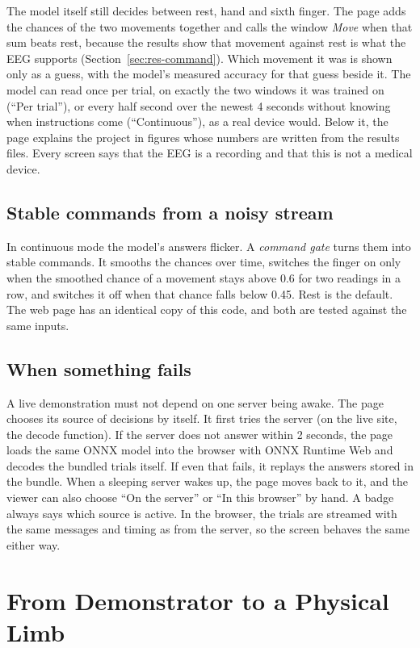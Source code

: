 The model itself still decides between rest, hand and sixth finger. The page adds the
chances of the two movements together and calls the window \emph{Move} when that sum
beats rest, because the results show that movement against rest is what the EEG supports
(Section~\ref{sec:res-command}). Which movement it was is shown only as a guess, with the
model's measured accuracy for that guess beside it. The model can read once per trial, on
exactly the two windows it was trained on (``Per trial''), or every half second over the
newest 4 seconds without knowing when instructions come (``Continuous''), as a real device
would. Below it, the page explains the project in figures whose numbers are written from
the results files. Every screen says that the EEG is a
recording and that this is not a medical device.

\subsection{Stable commands from a noisy stream}
In continuous mode the model's answers flicker. A \emph{command gate} turns them into
stable commands. It smooths the chances over time, switches the
finger on only when the smoothed chance of a movement stays above 0.6 for two readings in
a row, and switches it off when that chance falls below 0.45. Rest is the default. The
web page has an identical copy of this code, and both are tested against the same inputs.


\subsection{When something fails}
A live demonstration must not depend on one server being awake. The page chooses its
source of decisions by itself. It first tries the server (on the live site, the decode
function). If the server does not answer within 2 seconds, the page loads the same ONNX model into the
browser with ONNX Runtime Web and decodes the bundled trials itself. If even that fails,
it replays the answers stored in the bundle. When a sleeping server wakes up, the page
moves back to it, and the viewer can also choose ``On the server'' or ``In this browser''
by hand. A badge always says which source is active. In the browser, the trials are
streamed with the same messages and timing as from the server, so the screen behaves the
same either way.


\section{From Demonstrator to a Physical Limb}\label{sec:limb}

